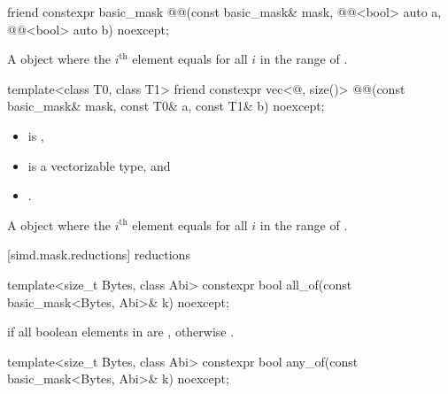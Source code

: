 \begin{itemdecl}
friend constexpr basic_mask
@@(const basic_mask& mask, @@<bool> auto a, @@<bool> auto b) noexcept;
\end{itemdecl}

\begin{itemdescr}
\pnum
\returns
A  object where the $i^\text{th}$ element equals
 for all $i$ in the range of .
\end{itemdescr}

\begin{itemdecl}
template<class T0, class T1>
  friend constexpr vec<@\seebelow@, size()>
    @@(const basic_mask& mask, const T0& a, const T1& b) noexcept;
\end{itemdecl}

\begin{itemdescr}
\pnum
\constraints
\begin{itemize}
 \item
    is ,
 \item
    is a vectorizable type, and
 \item
   .
\end{itemize}

\pnum
\returns
A  object where the $i^\text{th}$ element equals
 for all $i$ in the range of .
\end{itemdescr}

[simd.mask.reductions]{ reductions}

\begin{itemdecl}
template<size_t Bytes, class Abi>
  constexpr bool all_of(const basic_mask<Bytes, Abi>& k) noexcept;
\end{itemdecl}

\begin{itemdescr}
\pnum
\returns
{} if all boolean elements in  are , otherwise
.
\end{itemdescr}

\begin{itemdecl}
template<size_t Bytes, class Abi>
  constexpr bool any_of(const basic_mask<Bytes, Abi>& k) noexcept;
\end{itemdecl}

